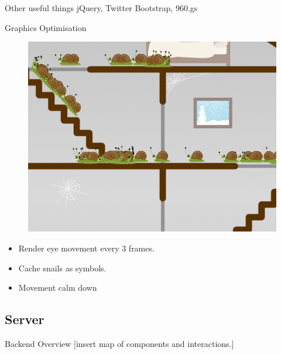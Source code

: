 \documentclass{beamer}
\begin{document}
\begin{frame}{Other useful things}
  jQuery, Twitter Bootstrap, 960.gs
\end{frame}

\begin{frame}{Graphics Optimisation}
  \begin{figure}[Snails]
    \centering
    \includegraphics[scale=0.25]{SnailsScreenshot.png}
  \end{figure}
  \begin{itemize}
    \item Render eye movement every 3 frames.
    \item Cache snails as symbols.
    \item Movement calm down
  \end{itemize}
\end{frame}

\subsection{Server}

\begin{frame}{Backend Overview}
  [insert map of components and interactions.]
\end{frame}
\end{document}
